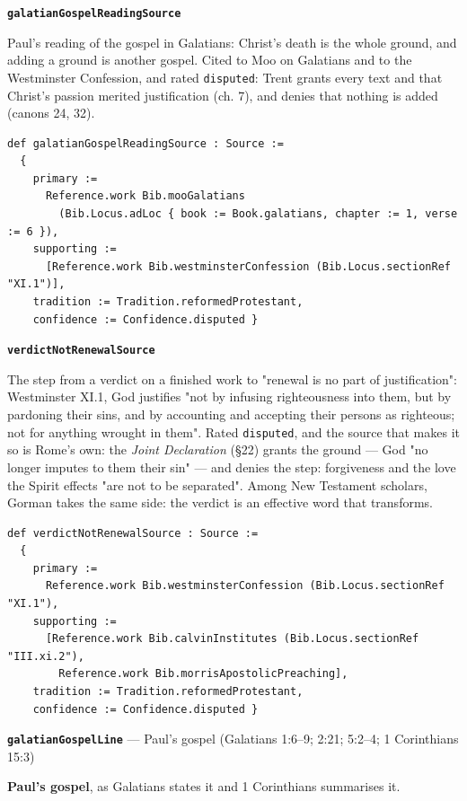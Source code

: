 \documentclass[11pt]{article}
\begin{document}
\par\medskip\noindent\textbf{\texttt{galatian\allowbreak{}Gospel\allowbreak{}Reading\allowbreak{}Source}}\par\nobreak\noindent
Paul's reading of the gospel in Galatians: Christ's death is the whole ground, and adding a ground is another gospel. Cited to Moo on Galatians and to the Westminster Confession, and rated \texttt{disputed}: Trent grants every text and that Christ's passion merited justification (ch. 7), and denies that nothing is added (canons 24, 32).

{\small\begin{verbatim}
def galatianGospelReadingSource : Source :=
  {
    primary :=
      Reference.work Bib.mooGalatians
        (Bib.Locus.adLoc { book := Book.galatians, chapter := 1, verse := 6 }),
    supporting :=
      [Reference.work Bib.westminsterConfession (Bib.Locus.sectionRef "XI.1")],
    tradition := Tradition.reformedProtestant,
    confidence := Confidence.disputed }
\end{verbatim}}
\par\medskip\noindent\textbf{\texttt{verdict\allowbreak{}Not\allowbreak{}Renewal\allowbreak{}Source}}\par\nobreak\noindent
The step from a verdict on a finished work to "renewal is no part of justification": Westminster XI.1, God justifies "not by infusing righteousness into them, but by pardoning their sins, and by accounting and accepting their persons as righteous; not for anything wrought in them". Rated \texttt{disputed}, and the source that makes it so is Rome's own: the \emph{Joint Declaration} (§22) grants the ground — God "no longer imputes to them their sin" — and denies the step: forgiveness and the love the Spirit effects "are not to be separated". Among New Testament scholars, Gorman takes the same side: the verdict is an effective word that transforms.

{\small\begin{verbatim}
def verdictNotRenewalSource : Source :=
  {
    primary :=
      Reference.work Bib.westminsterConfession (Bib.Locus.sectionRef "XI.1"),
    supporting :=
      [Reference.work Bib.calvinInstitutes (Bib.Locus.sectionRef "III.xi.2"),
        Reference.work Bib.morrisApostolicPreaching],
    tradition := Tradition.reformedProtestant,
    confidence := Confidence.disputed }
\end{verbatim}}
\par\medskip\noindent\textbf{\texttt{galatian\allowbreak{}Gospel\allowbreak{}Line}} --- Paul's gospel (Galatians 1:6–9; 2:21; 5:2–4; 1 Corinthians 15:3)\par\nobreak\noindent
\textbf{Paul's gospel}, as Galatians states it and 1 Corinthians summarises it.
\end{document}
